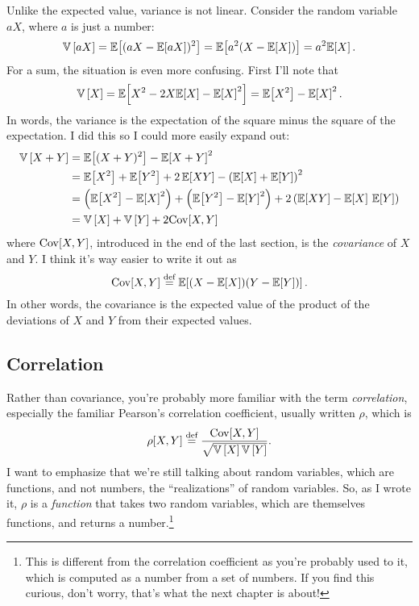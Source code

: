 Unlike the expected value, variance is not linear. Consider the random variable $aX$,
where $a$ is just a number:
\begin{equation}
\mathbb{V}\left[{aX}\right] = \mathbb{E}\!\left[{(aX - \mathbb{E}\!\left[{aX}\right])^2}\right] = \mathbb{E}\!\left[{a^2(X - \mathbb{E}\!\left[{X}\right])}\right] = a^2 \mathbb{E}\!\left[{X}\right].
\end{equation}
For a sum, the situation is even more confusing. First I'll note that
\begin{equation}
\mathbb{V}\left[{X}\right] = \mathbb{E}\!\left[{X^2 - 2X \mathbb{E}\!\left[{X}\right] - \mathbb{E}\!\left[{X}\right]^2}\right]
  = \mathbb{E}\!\left[{X^2}\right] - \mathbb{E}\!\left[{X}\right]^2.
\end{equation}
In words, the variance is the expectation of the square minus the square of
the expectation. I did this so I could more easily expand out:
\begin{align*}
\var{X + Y} &= \expect{(X+Y)^2} - \expect{X+Y}^2 \\
  &= \expect{X^2} + \expect{Y^2} + 2\, \expect{XY} - \left(\expect{X}+\expect{Y}\right)^2 \\
  &= \left(\expect{X^2} - \expect{X}^2\right) +
    \left(\expect{Y^2} - \expect{Y}^2\right) +
    2 \left(\expect{XY} - \expect{X} \, \expect{Y}\right) \\
  &= \var{X} + \var{Y} + 2 \cov{X, Y}
\end{align*}
where $\mathrm{Cov}\!\left[{X, Y}\right]$, introduced in the end of the last section, is the
\emph{covariance} of $X$ and $Y$. I think it's way easier to write it out as
\begin{equation}
\mathrm{Cov}\!\left[{X, Y}\right] \stackrel{\text{def}}{=} \mathbb{E}\!\left[{(X - \mathbb{E}\!\left[{X}\right])(Y - \mathbb{E}\!\left[{Y}\right])}\right].
\end{equation}
In other words, the covariance is the expected value of the product of the
deviations of $X$ and $Y$ from their expected values.

\subsection{Correlation}

Rather than covariance, you're probably more
familiar with the term \emph{correlation}, especially the familiar Pearson's
correlation coefficient, usually written $\rho$, which is
\begin{equation}
\rho[X, Y] \stackrel{\text{def}}{=} \frac{\mathrm{Cov}\!\left[{X, Y}\right]}{\sqrt{\mathbb{V}\left[{X}\right] \mathbb{V}\left[{Y}\right]}}.
\end{equation}
I want to emphasize that we're still talking about random variables, which are
functions, and not numbers, the ``realizations'' of random variables. So, as I
wrote it, $\rho$ is a \emph{function} that takes two random variables, which
are themselves functions, and returns a number.\footnote{This is different
from the correlation coefficient as you're probably used to it, which is
computed as a number from a set of numbers. If you find this curious, don't
worry, that's what the next chapter is about!}

